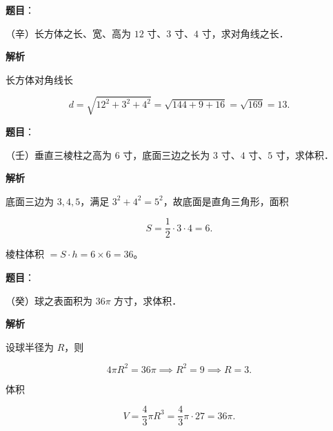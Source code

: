 \begin{answer}

\textbf{题目}：

（辛）长方体之长、宽、高为 $12$ 寸、$3$ 寸、$4$ 寸，求对角线之长．

\textbf{解析}

长方体对角线长

\nopagebreak[4]
\[
d=\sqrt{12^2+3^2+4^2}=\sqrt{144+9+16}=\sqrt{169}=13.
\]


\end{answer}
\begin{answer}

\textbf{题目}：

（壬）垂直三棱柱之高为 $6$ 寸，底面三边之长为 $3$ 寸、$4$ 寸、$5$ 寸，求体积．

\textbf{解析}

底面三边为 $3,4,5$，满足 $3^2+4^2=5^2$，故底面是直角三角形，面积

\nopagebreak[4]
\[
S=\frac12\cdot3\cdot4=6.
\]

棱柱体积 $=S\cdot h=6\times6=36$。


\end{answer}
\begin{answer}

\textbf{题目}：

（癸）球之表面积为 $36\pi$ 方寸，求体积．

\textbf{解析}

设球半径为 $R$，则

\nopagebreak[4]
\[
4\pi R^2=36\pi\implies R^2=9\implies R=3.
\]

体积

\nopagebreak[4]
\[
V=\frac43\pi R^3=\frac43\pi\cdot27=36\pi.
\]


\par\medskip


\end{answer}
